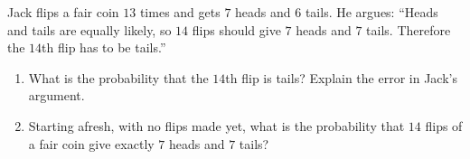 Jack flips a fair coin $13$ times and gets $7$ heads and $6$ tails. He argues: ``Heads and tails are equally likely, so $14$ flips should give $7$ heads and $7$ tails. Therefore the $14$th flip has to be tails.''
\begin{enumerate}
\item[(a)] What is the probability that the $14$th flip is tails? Explain the error in Jack's argument.
\item[(b)] Starting afresh, with no flips made yet, what is the probability that $14$ flips of a fair coin give exactly $7$ heads and $7$ tails?
\end{enumerate}
